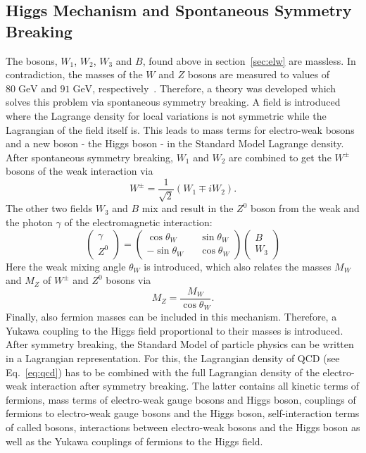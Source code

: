 	\subsection{Higgs Mechanism and Spontaneous Symmetry Breaking}
	\label{sec:higgs}
	The bosons, $W_1$, $W_2$, $W_3$ and $B$, found above in section~\ref{sec:elw} are massless. In contradiction, the masses of the $W$ and $Z$ bosons are measured to values of $80\;\text{GeV}$ and $91\;\text{GeV}$, respectively~\cite{pdg2016}. Therefore, a theory was developed which solves this problem via spontaneous symmetry breaking. A field is introduced where the Lagrange density for local variations is not symmetric while the Lagrangian of the field itself is. This leads to mass terms for electro-weak bosons and a new boson - the Higgs boson - in the Standard Model Lagrange density. After spontaneous symmetry breaking, $W_1$ and $W_2$ are combined to get the $W^\pm$ bosons of the weak interaction via
	\begin{equation}
	W^\pm = \frac{1}{\sqrt{2}}(W_1 \mp i W_2).
	\label{eq:W}
	\end{equation}
	The other two fields $W_3$ and $B$ mix and result in the $Z^0$ boson from the weak and the photon $\gamma$ of the electromagnetic interaction:
	\begin{equation}
	\begin{pmatrix}\gamma \\ Z^0\end{pmatrix} =
	\begin{pmatrix}
	\cos \theta_W && \sin \theta_W \\
	-\sin \theta_W && \cos \theta_W 
	\end{pmatrix}
	\begin{pmatrix}B \\ W_3\end{pmatrix}
	\label{eq:Z}
	\end{equation}	
	Here the weak mixing angle $\theta_W$ is introduced, which also relates the masses $M_W$ and $M_Z$ of $W^\pm$ and $Z^0$ bosons via
	\begin{equation}
	M_Z = \frac{M_W}{\cos \theta_W}.
	\end{equation}
	Finally, also fermion masses can be included in this mechanism. Therefore, a Yukawa coupling to the Higgs field proportional to their masses is introduced. After symmetry breaking, the Standard Model of particle physics can be written in a Lagrangian representation. For this, the Lagrangian density of QCD (see Eq.~\ref{eq:qcd}) has to be combined with the full Lagrangian density of the electro-weak interaction after symmetry breaking. The latter contains all kinetic terms of fermions, mass terms of electro-weak gauge bosons and Higgs boson, couplings of fermions to electro-weak gauge bosons and the Higgs boson, self-interaction terms of called bosons, interactions between electro-weak bosons and the Higgs boson as well as the Yukawa couplings of fermions to the Higgs field.

